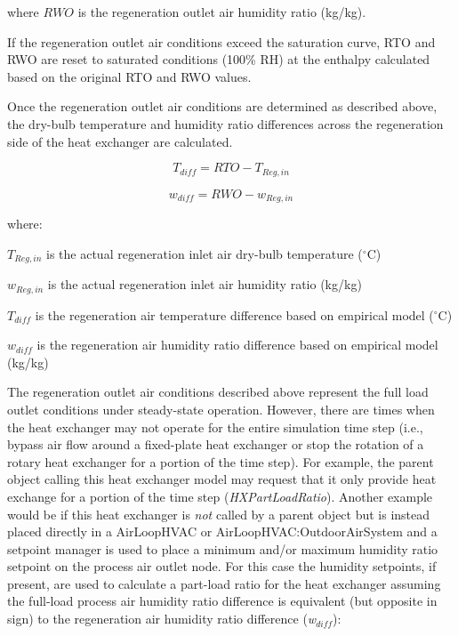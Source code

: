 where \(RWO\) is the regeneration outlet air humidity ratio (kg/kg).

If the regeneration outlet air conditions exceed the saturation curve, RTO and RWO are reset to saturated conditions (100\% RH) at the enthalpy calculated based on the original RTO and RWO values.

Once the regeneration outlet air conditions are determined as described above, the dry-bulb temperature and humidity ratio differences across the regeneration side of the heat exchanger are calculated.

\begin{equation}
{T_{diff}} = RTO - {T_{Reg,in}}
\end{equation}

\begin{equation}
{w_{diff}} = RWO - {w_{Reg,in}}
\end{equation}

where:

\({T_{Reg,in}}\) is the actual regeneration inlet air dry-bulb temperature (\(^{\circ}\)C)

\({w_{Reg,in}}\) is the actual regeneration inlet air humidity ratio (kg/kg)

\({T_{diff}}\) is the regeneration air temperature difference based on empirical model (\(^{\circ}\)C)

\({w_{diff}}\) is the regeneration air humidity ratio difference based on empirical model (kg/kg)

The regeneration outlet air conditions described above represent the full load outlet conditions under steady-state operation. However, there are times when the heat exchanger may not operate for the entire simulation time step (i.e., bypass air flow around a fixed-plate heat exchanger or stop the rotation of a rotary heat exchanger for a portion of the time step). For example, the parent object calling this heat exchanger model may request that it only provide heat exchange for a portion of the time step (\emph{HXPartLoadRatio}). Another example would be if this heat exchanger is \emph{not} called by a parent object but is instead placed directly in a AirLoopHVAC or AirLoopHVAC:OutdoorAirSystem and a setpoint manager is used to place a minimum and/or maximum humidity ratio setpoint on the process air outlet node. For this case the humidity setpoints, if present, are used to calculate a part-load ratio for the heat exchanger assuming the full-load process air humidity ratio difference is equivalent (but opposite in sign) to the regeneration air humidity ratio difference (\emph{w\(_{diff}\)}):


